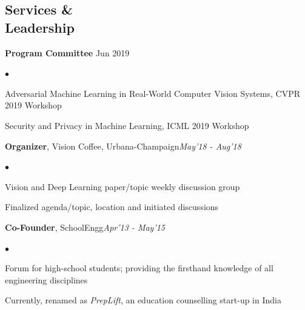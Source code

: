 \documentclass[margin,line]{res}
\newenvironment{list2}{
  \begin{list}{$\bullet$}{%
      \setlength{\itemsep}{0in}
      \setlength{\parsep}{0in} \setlength{\parskip}{0in}
      \setlength{\topsep}{0in} \setlength{\partopsep}{0in} 
      \setlength{\leftmargin}{0.2in}}}{\end{list}}
\begin{document}
\begin{resume}

\section{\sc \large Services \& \\ Leadership}
{\bf Program Committee} {\hfill Jun 2019}\vspace*{-0.15in}\\
\begin{list2}
\item Adversarial Machine Learning in Real-World Computer Vision Systems, CVPR 2019 Workshop
\item Security and Privacy in Machine Learning, ICML 2019 Workshop
\end{list2}\vspace*{-0.05in} 
{\bf Organizer}, Vision Coffee, Urbana-Champaign{\hfill \em May'18 - Aug'18}\vspace*{-0.15in}\\
\begin{list2}
\item Vision and Deep Learning paper/topic weekly discussion group
\item Finalized agenda/topic, location and initiated discussions 
\end{list2}\vspace*{-0.05in} 
{\bf Co-Founder}, SchoolEngg{\hfill \em Apr'13 - May'15}\vspace*{-0.15in}\\
\begin{list2}
\item Forum for high-school students; providing the firsthand knowledge of all engineering disciplines
\item Currently, renamed as {\em PrepLift}, an education counselling start-up in India
\end{list2}\vspace*{-0.05in} 

\end{resume}
\end{document}
